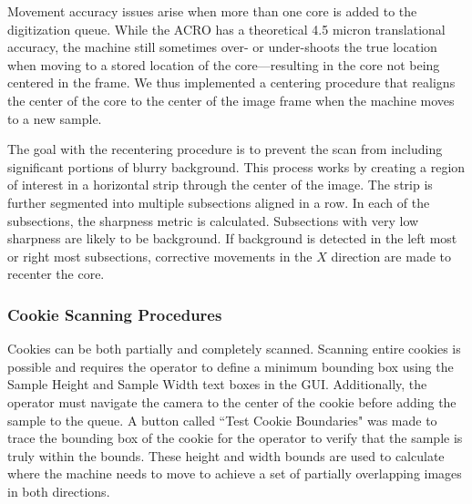 \documentclass[a4paper,12pt]{article}
\begin{document}
Movement accuracy issues arise when more than one core is added to the digitization queue.
While the ACRO has a theoretical 4.5 micron translational accuracy, the machine still sometimes over- or under-shoots the true location when moving to a stored location of the core---resulting in the core not being centered in the frame.
We thus implemented a centering procedure that realigns the center of the core to the center of the image frame when the machine moves 
to a new sample. 

The goal with the recentering procedure is to prevent the scan from including significant portions of blurry background.
This process works by creating a region of interest in a horizontal strip through the center of the image. The strip is further segmented into multiple subsections aligned in a row.
In each of the subsections, the sharpness metric is calculated. Subsections with very low sharpness are likely to be background.
If background is detected in the left most or right most subsections, corrective movements in the $X$ direction are made to recenter the core.


\subsubsection{Cookie Scanning Procedures}  

Cookies can be both partially and completely scanned. Scanning entire cookies is possible and requires the operator to define a minimum bounding box using the Sample Height and Sample Width text boxes in the GUI.
Additionally, the operator must navigate the camera to the center of the cookie before adding the sample to the queue. A button called ``Test Cookie Boundaries" was made to trace the bounding box of the cookie for the operator
to verify that the sample is truly within the bounds. These height and width bounds are used to calculate where the machine needs to move to achieve a set of partially overlapping images in both directions. 
\end{document}

